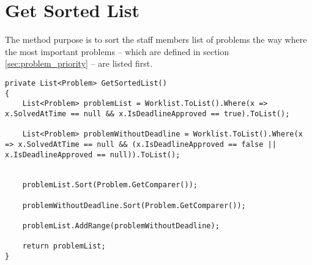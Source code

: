 \section{Get Sorted List}
\label{sec:getsortedlist}

The  method purpose is to sort the staff members list of problems the way where the most important problems -- which are defined in section \ref{sec:problem_priority} -- are listed first. 



\begin{lstlisting}[style=sourceCode, caption=\myCaption{The ManageTagTimes method}, label=lst:getsortedlist]
private List<Problem> GetSortedList()
{
    List<Problem> problemList = Worklist.ToList().Where(x => x.SolvedAtTime == null && x.IsDeadlineApproved == true).ToList();

    List<Problem> problemWithoutDeadline = Worklist.ToList().Where(x => x.SolvedAtTime == null && (x.IsDeadlineApproved == false || x.IsDeadlineApproved == null)).ToList();


    problemList.Sort(Problem.GetComparer());

    problemWithoutDeadline.Sort(Problem.GetComparer());

    problemList.AddRange(problemWithoutDeadline);

    return problemList;
}
\end{lstlisting}